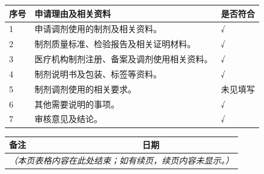 \documentclass[UTF8,10pt,a4paper,fontset=fandol]{ctexart}
\newcommand{\fieldvalue}[1]{#1}
\newcommand{\handwritten}[1]{#1}
\begin{document}
\small
\begin{tabularx}{\textwidth}{|p{}|X|p{}|}
\hline
\textbf{序号} & \textbf{申请理由及相关资料} & \textbf{是否符合} \\
\hline
1 &
申请调剂使用的制剂及相关资料。 &
\fieldvalue{\handwritten{√}} \\
\hline
2 &
制剂质量标准、检验报告及相关证明材料。 &
\fieldvalue{\handwritten{√}} \\
\hline
3 &
医疗机构制剂注册、备案及调剂使用相关资料。 &
\fieldvalue{\handwritten{√}} \\
\hline
4 &
制剂说明书及包装、标签等资料。 &
\fieldvalue{\handwritten{√}} \\
\hline
5 &
制剂调剂使用的相关要求。 &
未见填写 \\
\hline
6 &
其他需要说明的事项。 &
\fieldvalue{\handwritten{√}} \\
\hline
7 &
审核意见及结论。 &
\fieldvalue{\handwritten{√}} \\
\hline
\end{tabularx}
\normalsize

\vspace{3mm}

\noindent
\begin{tabularx}{\textwidth}{|p{}|X|p{}|}
\hline
\textbf{备注} & & \textbf{日期} \\
\hline
\multicolumn{3}{|l|}{\textit{（本页表格内容在此处结束；如有续页，续页内容未显示。）}} \\
\hline
\end{tabularx}
\end{document}
